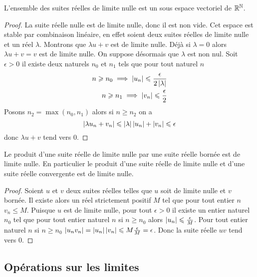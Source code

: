\begin{prop}
  L'ensemble des suites réelles de limite nulle est un sous espace vectoriel de \(\mathbb{R}^{\mathbb{N}}\).
\end{prop}
\begin{proof}
  La suite réelle nulle est de limite nulle, donc il est non vide. Cet espace est stable par combinaison linéaire, en effet soient deux suites réelles de limite nulle et un réel \(\lambda\). Montrons que \(\lambda u+v\) est de limite nulle. Déjà si \(\lambda=0\) alors \(\lambda u+v=v\) est de limite nulle. On suppose désormais que \(\lambda\) est non nul. Soit \(\epsilon>0\) il existe deux naturels \(n_0\) et \(n_1\) tels que pour tout naturel \(n\)
  \begin{align}
    n \geqslant n_0 \implies \left\lvert u_n\right\rvert \leqslant \frac{\epsilon}{2\left\lvert\lambda\right\rvert} \\ n \geqslant n_1 \implies \left\lvert v_n\right\rvert \leqslant \frac{\epsilon}{2}
  \end{align}
  Posons \(n_2=\max(n_0,n_1)\) alors si \(n \geqslant n_2\) on a
  \begin{equation}
    \left\lvert\lambda u_n + v_n\right\rvert\leqslant \left\lvert\lambda\right\rvert\left\lvert u_n\right\rvert+\left\lvert v_n\right\rvert\leqslant \epsilon
  \end{equation}
  donc \(\lambda u+v\) tend vers 0.
\end{proof}
%
\begin{prop}
  Le produit d'une suite réelle de limite nulle par une suite réelle bornée est de limite nulle. En particulier le produit d'une suite réelle de limite nulle et d'une suite réelle convergente est de limite nulle.
\end{prop}
\begin{proof}
  Soient \(u\) et \(v\) deux suites réelles telles que \(u\) soit de limite nulle et \(v\) bornée. Il existe alors un réel strictement positif \(M\) tel que pour tout entier \(n\) \(v_n \leqslant M\). Puisque \(u\) est de limite nulle, pour tout \(\epsilon>0\) il existe un entier naturel \(n_0\) tel que pour tout entier naturel \(n\) si \(n \geqslant n_0\) alors \(\left\lvert u_n\right\rvert \leqslant \frac{\epsilon}{M}\). Pour tout entier naturel \(n\)  si \(n \geqslant n_0\) \(\left\lvert u_n v_n\right\rvert=\left\lvert u_n\right\rvert\left\lvert v_n\right\rvert\leqslant M \frac{\epsilon}{M}=\epsilon\). Donc la suite réelle \(uv\) tend vers 0.
\end{proof}

\subsection{Opérations sur les limites}

